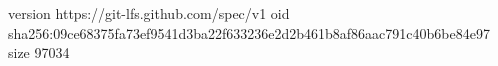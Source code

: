 version https://git-lfs.github.com/spec/v1
oid sha256:09ce68375fa73ef9541d3ba22f633236e2d2b461b8af86aac791c40b6be84e97
size 97034

